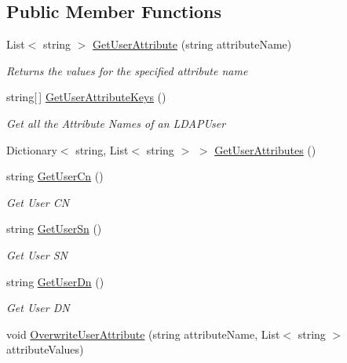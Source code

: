 \subsection*{Public Member Functions}
\begin{DoxyCompactItemize}
\item 
List$<$ string $>$ \hyperlink{interface_l_d_a_p_library_1_1_interfarces_1_1_i_ldap_user_ad9fb0415b7c5f1ecea9bcca568dc4d5b}{Get\+User\+Attribute} (string attribute\+Name)
\begin{DoxyCompactList}\small\item\em Returns the values for the specified attribute name \end{DoxyCompactList}\item 
string\mbox{[}$\,$\mbox{]} \hyperlink{interface_l_d_a_p_library_1_1_interfarces_1_1_i_ldap_user_ae0f3bc0df76d36f5ae90508c16560c84}{Get\+User\+Attribute\+Keys} ()
\begin{DoxyCompactList}\small\item\em Get all the Attribute Names of an L\+D\+A\+P\+User \end{DoxyCompactList}\item 
Dictionary$<$ string, List$<$ string $>$ $>$ \hyperlink{interface_l_d_a_p_library_1_1_interfarces_1_1_i_ldap_user_a82357f34323abea928b5424e3d4ef8bc}{Get\+User\+Attributes} ()
\item 
string \hyperlink{interface_l_d_a_p_library_1_1_interfarces_1_1_i_ldap_user_a2915de8e56c27d96660ff0b11cd5a61c}{Get\+User\+Cn} ()
\begin{DoxyCompactList}\small\item\em Get User C\+N \end{DoxyCompactList}\item 
string \hyperlink{interface_l_d_a_p_library_1_1_interfarces_1_1_i_ldap_user_ae80532025ebf42ca45298afac2bdcd2a}{Get\+User\+Sn} ()
\begin{DoxyCompactList}\small\item\em Get User S\+N \end{DoxyCompactList}\item 
string \hyperlink{interface_l_d_a_p_library_1_1_interfarces_1_1_i_ldap_user_aa9f1f36bd5918eb9a7feaa05bab098c2}{Get\+User\+Dn} ()
\begin{DoxyCompactList}\small\item\em Get User D\+N \end{DoxyCompactList}\item 
void \hyperlink{interface_l_d_a_p_library_1_1_interfarces_1_1_i_ldap_user_a6167e8f24247a123bfd041521a254a61}{Overwrite\+User\+Attribute} (string attribute\+Name, List$<$ string $>$ attribute\+Values)

\end{DoxyCompactItemize}
